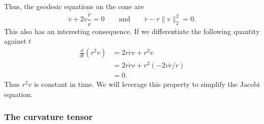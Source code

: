 \documentclass{article}
\begin{document}
Thus, the geodesic equations on the cone are
\begin{equation}\label{eq: geodesic equations on the cone}
    \dot v + 2v\frac{\dot r}{r} = 0 \qquad \text{and} \qquad \ddot r  - r\|v\|_2^2 = 0.
\end{equation}
This also has an interesting consequence. If we differentiate the following quantity against $t$
\begin{align*}
    \frac{d}{dt}(r^2v) &= 2r\dot rv + r^2 \dot v \\
    &= 2r \dot r v + r^2(-2v\dot r/r) \\
    &= 0.
\end{align*}
Thus $r^2v$ is constant in time. We will leverage this property to simplify the Jacobi equation. 

\subsubsection{The curvature tensor}
\end{document}
